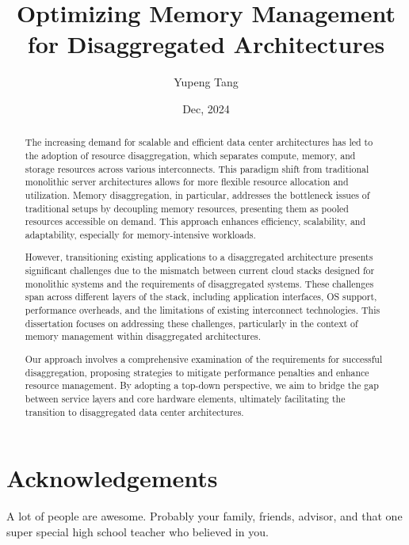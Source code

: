 \documentclass[letterpaper,11pt]{yalephd}
\begin{document}
\title{Optimizing Memory Management for Disaggregated Architectures} 
\author{Yupeng Tang}
\date{Dec, 2024} 

\frontmatter

\begin{abstract}
The increasing demand for scalable and efficient data center architectures has led to the adoption of resource disaggregation, which separates compute, memory, and storage resources across various interconnects. This paradigm shift from traditional monolithic server architectures allows for more flexible resource allocation and utilization. Memory disaggregation, in particular, addresses the bottleneck issues of traditional setups by decoupling memory resources, presenting them as pooled resources accessible on demand. This approach enhances efficiency, scalability, and adaptability, especially for memory-intensive workloads.

However, transitioning existing applications to a disaggregated architecture presents significant challenges due to the mismatch between current cloud stacks designed for monolithic systems and the requirements of disaggregated systems. These challenges span across different layers of the stack, including application interfaces, OS support, performance overheads, and the limitations of existing interconnect technologies. This dissertation focuses on addressing these challenges, particularly in the context of memory management within disaggregated architectures.

Our approach involves a comprehensive examination of the requirements for successful disaggregation, proposing strategies to mitigate performance penalties and enhance resource management. By adopting a top-down perspective, we aim to bridge the gap between service layers and core hardware elements, ultimately facilitating the transition to disaggregated data center architectures.
\end{abstract}


\maketitle
{} 
\tableofcontents
\listoffigures %
\listoftables %

\chapter{Acknowledgements} %
A lot of people are awesome. Probably your family, friends, 
advisor, and that one super special high school teacher who
believed in you.
\end{document}
